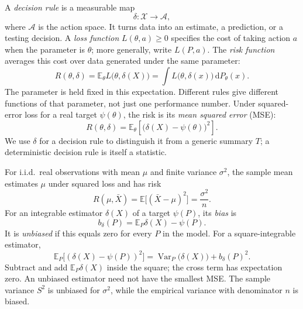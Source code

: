 \begin{definition}
A \emph{decision rule} is a measurable map
\[
\delta:\mathcal X\longrightarrow\mathcal A,
\]
where $\mathcal A$ is the action space. It turns data into an estimate, a
prediction, or a testing decision. A \emph{loss function}
$L(\theta,a)\geq0$ specifies the cost of taking action $a$ when the parameter
is $\theta$; more generally, write $L(P,a)$. The \emph{risk function}
averages this cost over data generated under the same parameter:
\begin{equation}
R(\theta,\delta)
=\mathbb E_\theta L\bigl(\theta,\delta(X)\bigr)
=\int L\bigl(\theta,\delta(x)\bigr)\,\mathrm dP_\theta(x).
\tag{7}
\end{equation}
The parameter is held fixed in this expectation. Different rules give
different functions of that parameter, not just one performance number.
Under squared-error loss for a real target $\psi(\theta)$, the risk is its
\emph{mean squared error} (MSE):
\[
R(\theta,\delta)
=\mathbb E_\theta\left[\bigl(\delta(X)-\psi(\theta)\bigr)^2\right].
\]
We use $\delta$ for a decision rule to distinguish it from a generic summary
$T$; a deterministic decision rule is itself a statistic.
\end{definition}

\begin{definition}
For i.i.d.\ real observations with mean $\mu$ and finite variance $\sigma^2$,
the sample mean estimates $\mu$ under squared loss and has risk
\[
R(\mu,\bar X)
=\mathbb E\bigl[(\bar X-\mu)^2\bigr]
=\frac{\sigma^2}{n}.
\]
For an
integrable estimator $\delta(X)$ of a target $\psi(P)$, its \emph{bias} is
\[
b_\delta(P)=\mathbb E_P\delta(X)-\psi(P).
\]
It is \emph{unbiased} if this equals zero for every $P$ in the model. For a
square-integrable estimator,
\begin{equation}
\mathbb E_P\bigl[(\delta(X)-\psi(P))^2\bigr]
=\operatorname{Var}_P\bigl(\delta(X)\bigr)+b_\delta(P)^2.
\tag{9}
\end{equation}
Subtract and add $\mathbb E_P\delta(X)$ inside the square; the cross term
has expectation zero. An unbiased estimator need not have the smallest MSE.
The sample variance $S^2$ is unbiased for $\sigma^2$, while the empirical
variance with denominator $n$ is biased.
\end{definition}

